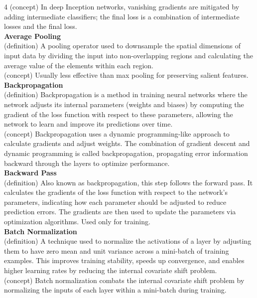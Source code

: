 \documentclass[8pt]{extarticle}
\begin{document}
\begin{multicols}{4}
(concept) In deep Inception networks, vanishing gradients are mitigated by adding intermediate classifiers; the final loss is a combination of intermediate losses and the final loss.\\
\vspace{2pt}\textbf{Average Pooling}\\
(definition) A pooling operator used to downsample the spatial dimensions of input data by dividing the input into non-overlapping regions and calculating the average value of the elements within each region.\\
(concept) Usually less effective than max pooling for preserving salient features.\\
\vspace{2pt}\textbf{Backpropagation}\\
(definition) Backpropagation is a method in training neural networks where the network adjusts its internal parameters (weights and biases) by computing the gradient of the loss function with respect to these parameters, allowing the network to learn and improve its predictions over time.\\
(concept) Backpropagation uses a dynamic programming-like approach to calculate gradients and adjust weights. The combination of gradient descent and dynamic programming is called backpropagation, propagating error information backward through the layers to optimize performance.\\
\vspace{2pt}\textbf{Backward Pass}\\
(definition) Also known as backpropagation, this step follows the forward pass. It calculates the gradients of the loss function with respect to the network's parameters, indicating how each parameter should be adjusted to reduce prediction errors. The gradients are then used to update the parameters via optimization algorithms. Used only for training.\\
\vspace{2pt}\textbf{Batch Normalization}\\
(definition) A technique used to normalize the activations of a layer by adjusting them to have zero mean and unit variance across a mini-batch of training examples. This improves training stability, speeds up convergence, and enables higher learning rates by reducing the internal covariate shift problem.\\
(concept) Batch normalization combats the internal covariate shift problem by normalizing the inputs of each layer within a mini-batch during training.\\

\end{multicols}
\end{document}

